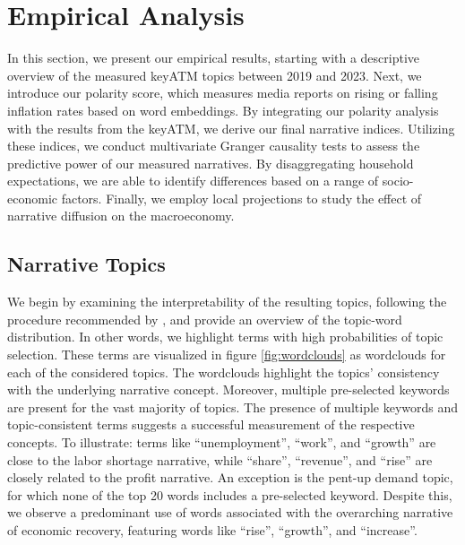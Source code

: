 \section{Empirical Analysis}\label{sec:Analysis}

 In this section, we present our empirical results, starting with a descriptive overview of the measured \textsf{keyATM} topics between 2019 and 2023. Next, we introduce our polarity score, which measures media reports on rising or falling inflation rates based on word embeddings. By integrating our polarity analysis with the results from the \textsf{keyATM}, we derive our final narrative indices. Utilizing these indices, we conduct multivariate Granger causality tests to assess the predictive power of our measured narratives. By disaggregating household expectations, we are able to identify differences based on a range of socio-economic factors. Finally, we employ local projections to study the effect of narrative diffusion on the macroeconomy.

\subsection{Narrative Topics}\label{subsec:atmtopics}

We begin by examining the interpretability of the resulting topics, following the procedure recommended by \citet{Eshima.2023}, and provide an overview of the topic-word distribution. In other words, we highlight terms with high probabilities of topic selection. These terms are visualized in figure \ref{fig:wordclouds} as wordclouds for each of the considered topics. The wordclouds highlight the topics' consistency with the underlying narrative concept. Moreover, multiple pre-selected keywords are present for the vast majority of topics. The presence of multiple keywords and topic-consistent terms suggests a successful measurement of the respective concepts. To illustrate: terms like ``unemployment'', ``work'', and ``growth'' are close to the labor shortage narrative, while ``share'', ``revenue'', and ``rise'' are closely related to the profit narrative. An exception is the pent-up demand topic, for which none of the top 20 words includes a pre-selected keyword. Despite this, we observe a predominant use of words associated with the overarching narrative of economic recovery, featuring words like ``rise'', ``growth'', and ``increase''.

